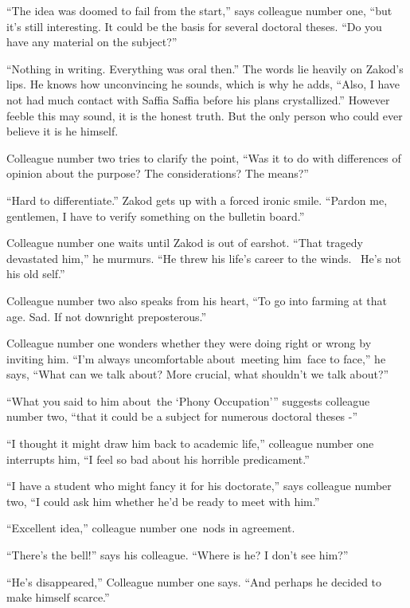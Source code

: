 \documentclass[twoside,11pt]{book}
\begin{document}
``The idea was doomed to fail from the start,'' says colleague number one, ``but it's still
interesting. It could be the basis for several doctoral theses. ``Do you have any material on the
subject?''

``Nothing in writing. Everything was oral then.'' The words lie heavily on Zakod's lips. He
knows how unconvincing he sounds, which is why he adds, ``Also, I have not had much contact with Saffia
Saffia before his plans crystallized.'' However feeble this may sound, it is the honest truth. But the
only person who could ever believe it is he himself.

Colleague number two tries to clarify the point, ``Was it to do with differences of opinion about the
purpose? The considerations? The means?''

``Hard to differentiate.'' Zakod gets up with a forced ironic smile. ``Pardon me,
gentlemen, I have to verify something on the bulletin board.''

Colleague number one waits until Zakod is out of earshot. ``That tragedy devastated him,'' he
murmurs. ``He threw his life's career to the winds. \ He's not his old self.''

Colleague number two also speaks from his heart, ``To go into farming at that age. Sad. If not downright
preposterous.''

Colleague number one wonders whether they were doing right or wrong by inviting him. ``I'm always uncomfortable
about~meeting him~face to face,'' he says, ``What can we talk about? More crucial, what shouldn't we talk
about?''

``What you said to him about~the `Phony Occupation'{}'' suggests colleague number two, ``that it could be a
subject for numerous doctoral theses -''

``I thought it might draw him back to academic life,'' colleague number one interrupts him, ``I feel so bad
about his horrible predicament.''

``I have a student who might fancy it for his doctorate,'' says colleague number two, ``I could ask him
whether he'd be ready to meet with him.''

``Excellent idea,'' colleague number one~nods in agreement.

``There's the bell!'' says his colleague. ``Where is he? I don't see him?''

{}``He's disappeared,'' Colleague number one says. ``And perhaps he decided to make himself
scarce.''


\bigskip
\end{document}
